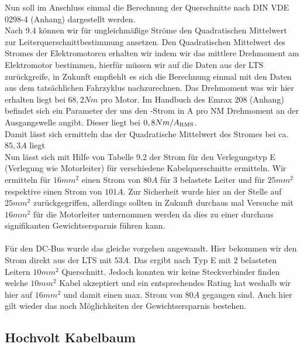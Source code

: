Nun soll im Anschluss einmal die Berechnung der Querschnitte nach DIN VDE 0298-4 (Anhang) dargestellt werden.\\
Nach 9.4 können wir für ungleichmäßige Ströme den Quadratischen Mittelwert zur Leiterquerschnittbestimmung ansetzen. Den Quadratischen Mittelwert des Stromes der Elektromotoren erhalten wir indem wir das mittlere Drehmoment am Elektromotor bestimmen, hierfür müssen wir auf die Daten aus der \ac{LTS} zurückgreife, in Zukunft empfiehlt es sich die Berechnung einmal mit den Daten aus dem tatsächlichen Fahrzyklus nachzurechnen. Das Drehmoment was wir hier erhalten liegt bei \ensuremath{68,2 Nm} pro Motor. Im Handbuch des Emrax 208 (Anhang) befindet sich ein Parameter der uns den -Strom in A pro NM Drehmoment an der Ausgangswelle angibt. Dieser liegt bei \ensuremath{0,8 Nm/A\textsubscript{RMS}}. \\
Damit lässt sich ermitteln das der Quadratische Mittelwert des Stromes bei ca. \ensuremath{85,3 A} liegt\\
Nun lässt sich mit Hilfe von Tabelle 9.2 der Strom für den Verlegungstyp E (Verlegung wie Motorleiter) für verschiedene Kabelquerschnitte ermitteln. Wir ermitteln für \ensuremath{16 mm^2} einen Strom von \ensuremath{80 A} für 3 belastete Leiter und für \ensuremath{25 mm^2} respektive einen Strom von \ensuremath{101 A}. Zur Sicherheit wurde hier an der Stelle auf \ensuremath{25mm^2} zurückgegriffen, allerdings sollten in Zukunft durchaus mal Versuche mit \ensuremath{16 mm^2} für die Motorleiter unternommen werden da dies zu einer durchaus signifikanten Gewichtsersparnis führen kann.\\
\\
Für den \ac{DC}-Bus wurde das gleiche vorgehen angewandt. Hier bekommen wir den Strom direkt aus der \ac{LTS} mit \ensuremath{53A}. Das ergibt nach Typ E mit 2 belasteten Leitern \ensuremath{10 mm^2} Querschnitt. Jedoch konnten wir keine Steckverbinder finden welche \ensuremath{10 mm^2} Kabel akzeptiert und ein entsprechendes Rating hat weshalb wir hier auf \ensuremath{16 mm^2} und damit einen max. Strom von \ensuremath{80 A} gegangen sind. Auch hier gilt wieder das noch Möglichkeiten der Gewichtsersparnis bestehen.\\

\FloatBarrier
\subsection{Hochvolt Kabelbaum}

